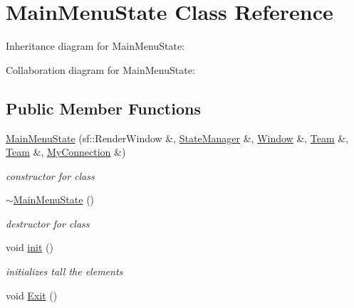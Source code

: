\hypertarget{class_main_menu_state}{\section{Main\+Menu\+State Class Reference}
\label{class_main_menu_state}
}


Inheritance diagram for Main\+Menu\+State\+:


Collaboration diagram for Main\+Menu\+State\+:
\subsection*{Public Member Functions}
\begin{DoxyCompactItemize}
\item 
\hypertarget{class_main_menu_state_a21fb6df55b950557a3c07e9ab647e7cf}{\hyperlink{class_main_menu_state_a21fb6df55b950557a3c07e9ab647e7cf}{Main\+Menu\+State} (sf\+::\+Render\+Window \&, \hyperlink{class_state_manager}{State\+Manager} \&, \hyperlink{class_window}{Window} \&, \hyperlink{class_team}{Team} \&, \hyperlink{class_team}{Team} \&, \hyperlink{class_my_connection}{My\+Connection} \&)}\label{class_main_menu_state_a21fb6df55b950557a3c07e9ab647e7cf}

\begin{DoxyCompactList}\small\item\em constructor for class \end{DoxyCompactList}\item 
\hypertarget{class_main_menu_state_a8af4d586b93c315a1a15b5fe83ec0760}{\hyperlink{class_main_menu_state_a8af4d586b93c315a1a15b5fe83ec0760}{$\sim$\+Main\+Menu\+State} ()}\label{class_main_menu_state_a8af4d586b93c315a1a15b5fe83ec0760}

\begin{DoxyCompactList}\small\item\em destructor for class \end{DoxyCompactList}\item 
\hypertarget{class_main_menu_state_a0bab9f3a0f088a0afb702e565875883a}{void \hyperlink{class_main_menu_state_a0bab9f3a0f088a0afb702e565875883a}{init} ()}\label{class_main_menu_state_a0bab9f3a0f088a0afb702e565875883a}

\begin{DoxyCompactList}\small\item\em initializes tall the elements \end{DoxyCompactList}\item 
\hypertarget{class_main_menu_state_a14d1ef82edd575de28b04102eeb334ce}{void \hyperlink{class_main_menu_state_a14d1ef82edd575de28b04102eeb334ce}{Exit} ()}\label{class_main_menu_state_a14d1ef82edd575de28b04102eeb334ce}


\end{DoxyCompactItemize}
